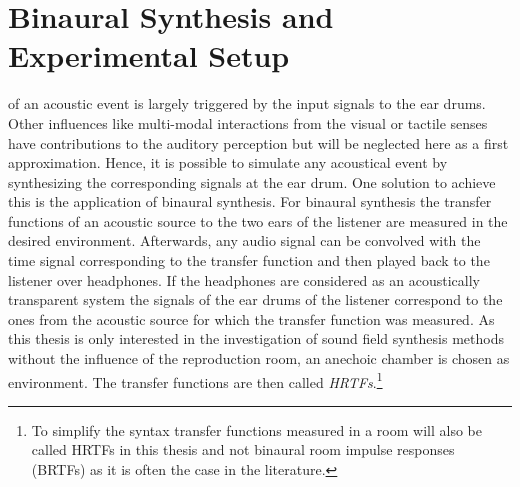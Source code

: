 \def \GITHUB {\GITHUBBASE/04_binaural_synthesis}


\chapter{Binaural Synthesis and Experimental Setup}
\label{cha:binaural}

 of an acoustic event is largely triggered by the input
signals to the ear drums. Other influences like multi-modal interactions from the
visual or tactile senses have contributions to the auditory perception but
will be neglected here as a first approximation. Hence, it is possible to simulate any
acoustical event by synthesizing the corresponding signals at the ear
drum.\autocite{Moller1992} One
solution to achieve this is the application of binaural synthesis. For binaural
synthesis the transfer functions of an acoustic source 
to the two ears of the listener are measured in the desired environment.
Afterwards, any audio signal can be
convolved with the time signal corresponding to the transfer function and then played
back to the listener over headphones. If the headphones are considered as
an acoustically transparent system the signals of the ear drums of the listener
correspond to the ones from the acoustic source for which the transfer function was measured.
As this thesis is only interested in the investigation of sound field synthesis
methods without the influence of the reproduction room, an anechoic chamber is
chosen as environment. The transfer functions are then called
\emph{\acfp{HRTF}}.\footnote{To simplify the syntax
transfer functions measured in a room will also be called \acp{HRTF} in this
thesis and not binaural room impulse responses (BRTFs) as it is often the case
in the literature.}
%
